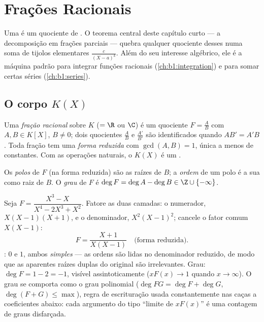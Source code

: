 \chapter{Frações Racionais}\label{ch:b1:fractions}

Uma  é um quociente de . O teorema central
deste capítulo curto --- a decomposição em frações
parciais --- quebra qualquer
quociente desses numa soma de tijolos elementares $\frac{c}{(X - a)^k}$.
Além do seu interesse algébrico, ele é a máquina padrão para
integrar funções racionais (\cref{ch:b1:integration}) e para
somar certas séries (\cref{ch:b1:series}).

\section{O corpo $K(X)$}

\begin{definition}\label{def:b1:fractions:field}
Uma \emph{fração racional} sobre $K$ ($= \R$
ou $\C$) é um quociente $F = \frac{A}{B}$ com $A, B \in K[X]$, $B \neq
0$; dois quocientes $\frac AB$ e $\frac{A'}{B'}$ são identificados quando
$AB' = A'B$. Toda fração tem uma \emph{forma reduzida} com
$\gcd(A, B) = 1$, única a menos de constantes. Com as operações naturais,
o  $K(X)$ é um .

Os \emph{polos} de $F$ (na forma reduzida) são as raízes de
$B$; a \emph{ordem} de um polo é a sua  como raiz de $B$.
O \emph{grau} de $F$ é $\deg F = \deg A - \deg B \in \Z \cup
\{-\infty\}$.
\end{definition}

\begin{example}\label{ex:b1:fractions:vocab}
Seja $F = \dfrac{X^3 - X}{X^4 - 2X^3 + X^2}$. Fatore as duas camadas:
o numerador, $X(X-1)(X+1)$, e o denominador, $X^2(X-1)^2$; cancele o
fator comum $X(X-1)$:
\[
F = \frac{X + 1}{X(X - 1)} \quad\text{(forma reduzida).}
\]
: $0$ e $1$, ambos \emph{simples} --- as ordens são lidas no
denominador reduzido, de modo que as aparentes raízes duplas do
original são irrelevantes. Grau: $\deg F = 1 - 2 = -1$,
visível assintoticamente ($xF(x) \to 1$ quando $x \to \infty$). O
grau se comporta como o grau polinomial ($\deg FG = \deg F +
\deg G$, $\deg(F + G) \leq \max$), regra de escrituração usada
constantemente nas caças a coeficientes abaixo: cada argumento do tipo
``limite de $xF(x)$'' é uma contagem de graus disfarçada.
\end{example}

